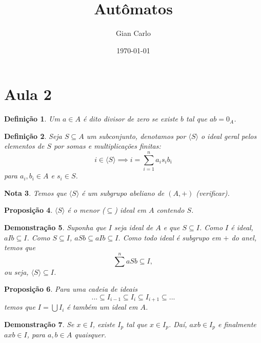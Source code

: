 \documentclass[11pt]{article}
\title{Autômatos}
\author{Gian Carlo}
\date{\today}
\theoremstyle{plain}
\newtheorem{definicao}{Definição}[section]
\newtheorem{nota}[definicao]{Nota}
\newtheorem{proposicao}[definicao]{Proposição}
\theoremstyle{nonumberplain}
\newtheorem{demonstracao}[definicao]{Demonstração}
\newcommand{\braket}[1]{\langle #1 \rangle}
\newcommand{\sseq}{\subseteq}
\begin{document}
\maketitle

\section{Aula 2}

\begin{definicao}
    Um $a \in A$ é dito divisor de zero se existe $b$ tal que $ab = 0_A$.
\end{definicao}

\begin{definicao}
    Seja $S \subseteq A$ um subconjunto, denotamos por $\braket S$ o ideal geral pelos elementos de $S$ por somas e multiplicações finitas: \begin{equation}
        i \in \braket S \implies i = \sum_{i = 1}^{n} a_is_ib_i
    \end{equation}
    para $a_i, b_i \in A$ e $s_i \in S$.
\end{definicao}

\begin{nota}
    Temos que $\braket S$ é um subgrupo abeliano de $(A, +)$ (verificar).
\end{nota}

\begin{proposicao}
    $\braket S$ é o menor ($\subseteq$) ideal em $A$ contendo $S$.
\end{proposicao}

\begin{demonstracao}
    Suponha que $I$ seja ideal de $A$ e que $S \sseq I$. Como $I$ é ideal, $aIb \sseq I$. Como $S \sseq I$, $aSb \sseq aIb \sseq I$. Como todo ideal é subgrupo em $+$ do anel, temos que \begin{equation}
        \sum^n aSb \sseq I,
    \end{equation} ou seja, $\braket S \sseq I$.
\end{demonstracao}

\begin{proposicao}
    Para uma cadeia de ideais \begin{equation}
        ... \subseteq I_{i-1} \subseteq I_i \subseteq I_{i+1} \subseteq ...
    \end{equation}
    temos que $I = \bigcup I_i$ é também um ideal em $A$.
\end{proposicao}

\begin{demonstracao}
    Se $x \in I$, existe $I_p$ tal que $x \in I_p$. Daí, $axb \in I_p$ e finalmente $axb \in I$, para $a, b \in A$ quaisquer.
\end{demonstracao}
\end{document}
